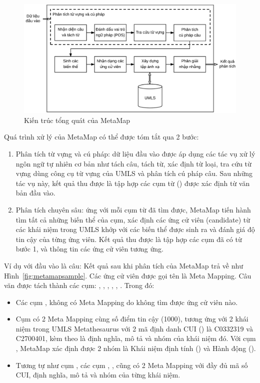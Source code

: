 \begin{figure}[H]
\centering
\includegraphics[scale=0.52]{../hinh/KienTrucMetamap.png}
\caption{Kiến trúc tổng quát của MetaMap \cite{Aronson2010}} \label{fig:kientrucmetamap}
\end{figure}

Quá trình xử lý của MetaMap có thể được tóm tắt qua 2 bước:
\begin{enumerate}
\item Phân tích từ vựng và cú pháp: dữ liệu đầu vào được áp dụng các tác vụ xử lý ngôn ngữ tự nhiên cơ bản như tách câu, tách từ, xác định từ loại, tra cứu từ vựng dùng công cụ từ vựng của UMLS và phân tích cú pháp câu. Sau những tác vụ này, kết quả thu được là tập hợp các cụm từ () được xác định từ văn bản đầu vào.
\item Phân tích chuyên sâu: ứng với mỗi cụm từ đã tìm được, MetaMap tiến hành tìm tất cả những biến thể của cụm, xác định các ứng cử viên (candidate) từ các khái niệm trong UMLS khớp với các biến thể được sinh ra và đánh giá độ tin cậy của từng ứng viên. Kết quả thu được là tập hợp các cụm đã có từ bước 1, và thông tin các ứng cử viên tương ứng.
\end{enumerate}

Ví dụ với đầu vào là câu:  Kết quả sau khi phân tích của MetaMap trả về như Hình~\ref{fig:metamapsample}. Các ứng cử viên được gọi tên là Meta Mapping. Câu văn được tách thành các cụm: , , , , , . Trong đó:
\begin{itemize}
\item Các cụm ,  không có Meta Mapping do không tìm được ứng cử viên nào.
\item Cụm  có 2 Meta Mapping cùng số điểm tin cậy (1000), tương ứng với 2 khái niệm trong UMLS Metathesaurus với 2 mã định danh CUI () là C0332319 và C2700401, kèm theo là định nghĩa, mô tả và nhóm của khái niệm đó. Với cụm , MetaMap xác định được 2 nhóm là Khái niệm định tính () và Hành động ().
\item Tương tự như cụm , các cụm , ,  cũng có 2 Meta Mapping với đầy đủ mã số CUI, định nghĩa, mô tả và nhóm của từng khái niệm.
\end{itemize}

